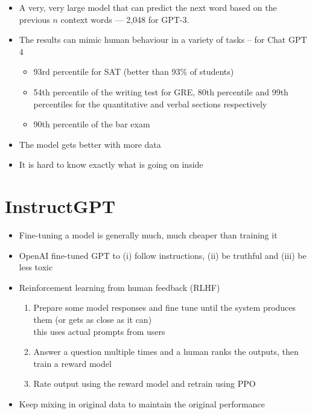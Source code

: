 \documentclass[25pt,a4paper,landscape,headrule,footrule,xetex]{foils}
\begin{document}

\begin{itemize}
\item A very, very large model that can predict the next word based on the previous $n$ context words --- 2,048 for GPT-3.
\item The results can mimic human behaviour in a variety of tasks -- for Chat GPT 4
  \begin{itemize}
  \item 93rd percentile for SAT (better than 93\% of students)
  \item 54th percentile of the writing test for GRE, 80th percentile
    and 99th percentiles for the quantitative and verbal sections
    respectively
  \item 90th percentile of the bar exam 
  \end{itemize}
\item The model gets better with more data
\item It is hard to know exactly what is going on inside
\end{itemize}

\section{InstructGPT}


\begin{itemize}
\item Fine-tuning a model is generally much, much cheaper than training it
\item OpenAI fine-tuned GPT to (i) follow instructions, (ii) be truthful and (iii) be less toxic
\item  Reinforcement learning from  human feedback (RLHF)
  \begin{enumerate}
  \item Prepare some model responses and fine tune until the system
    produces them (or gets as close as it can)
    \\ this uses actual prompts from users
  \item Answer a question multiple times and a human ranks the
    outputs, then train a reward model 
  \item Rate output using the reward model and retrain using PPO
  \end{enumerate}
\item  Keep mixing in original data to maintain the original performance
    
\end{itemize}
\end{document}
